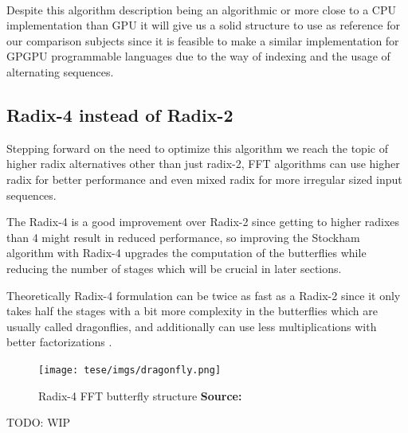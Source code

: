 \documentclass[
  oneside,
  11pt, a4paper,
  footinclude=true,
  headinclude=true,
  cleardoublepage=empty
]{scrbook}
\newcommand*{\source}[1]{%
    \textbf{Source:} \cite{#1}%
}
\begin{document}
\paragraph{}
Despite this algorithm description being an algorithmic or more close to a CPU implementation than GPU it will give us a solid structure to use as reference for our comparison subjects since it is feasible to make a similar implementation for GPGPU programmable languages due to the way of indexing and the usage of alternating sequences.

\subsection{Radix-4 instead of Radix-2}

Stepping forward on the need to optimize this algorithm we reach the topic of higher radix alternatives other than just radix-2, FFT algorithms can use higher radix for better performance and even mixed radix \cite{singleton1969algorithm} for more irregular sized input sequences.

The Radix-4 is a good improvement over Radix-2 since getting to higher radixes than 4 might result in reduced performance, so improving the Stockham algorithm with Radix-4 upgrades the computation of the butterflies while reducing the number of stages which will be crucial in later sections.

Theoretically Radix-4 formulation can be twice as fast as a Radix-2 \cite{hussain2010evaluation} since it only takes half the stages with a bit more complexity in the butterflies which are usually called dragonflies, and additionally can use less multiplications with better factorizations \cite{marti2009radix}.


\begin{figure}[h] 
    \centering
    \texttt{[image: tese/imgs/dragonfly.png]}
    \caption{Radix-4 FFT butterfly structure \source{marti2009radix}}
    \label{fig:radix4-dragonfly}
\end{figure}


TODO: WIP
\end{document}
